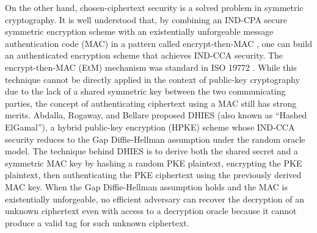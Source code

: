 \documentclass[journal=tches,submission]{iacrtrans}
\begin{document}
On the other hand, chosen-ciphertext security is a solved problem in symmetric cryptography. It is well understood that, by combining an IND-CPA secure symmetric encryption scheme with an existentially unforgeable message authentication code (MAC) in a pattern called encrypt-then-MAC \cite{DBLP:conf/crypto/Krawczyk01}, one can build an authenticated encryption scheme \cite{DBLP:conf/asiacrypt/BellareN00} that achieves IND-CCA security. The encrypt-then-MAC (EtM) mechanism was standard in ISO 19772 \cite{international2009iso-encrypt-then-mac}. While this technique cannot be directly applied in the context of public-key cryptography due to the lack of a shared symmetric key between the two communicating parties, the concept of authenticating ciphertext using a MAC still has strong merits. Abdalla, Rogaway, and Bellare proposed DHIES (also known as ``Hashed ElGamal'')\cite{DBLP:journals/iacr/AbdallaBR99}\cite{DBLP:conf/ctrsa/AbdallaBR01}, a hybrid public-key encryption (HPKE) scheme whose IND-CCA security reduces to the Gap Diffie-Hellman assumption \cite{DBLP:conf/pkc/OkamotoP01} under the random oracle model. The technique behind DHIES is to derive both the shared secret and a symmetric MAC key by hashing a random PKE plaintext, encrypting the PKE plaintext, then authenticating the PKE ciphertext using the previously derived MAC key. When the Gap Diffie-Hellman assumption holds and the MAC is existentially unforgeable, no efficient adversary can recover the decryption of an unknown ciphertext even with access to a decryption oracle because it cannot produce a valid tag for such unknown ciphertext. 
\end{document}
